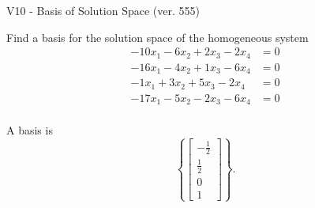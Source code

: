 \begin{exercise}
  \begin{exerciseTitle}V10 - Basis of Solution Space (ver. 555)\end{exerciseTitle}
  \begin{exerciseStatement}
    Find a basis for the solution space of the homogeneous system 
\begin{align*}
 -10 x_ 1 -6 x_ 2 + 2 x_ 3 -2 x_ 4 &= 0  \\ 
  -16 x_ 1 -4 x_ 2 + 1 x_ 3 -6 x_ 4 &= 0  \\ 
  -1 x_ 1 + 3 x_ 2 + 5 x_ 3 -2 x_ 4 &= 0  \\ 
  -17 x_ 1 -5 x_ 2 -2 x_ 3 -6 x_ 4 &= 0  \\ 
 \end{align*}


 
  \end{exerciseStatement}

  \begin{exerciseAnswer}
   A basis is   
\[\left\{\left[\begin{array}{c}
-\frac{1}{2} \\
\frac{1}{2} \\
0 \\
1
\end{array}\right]\right\}.\]

  


  \end{exerciseAnswer}
\end{exercise}